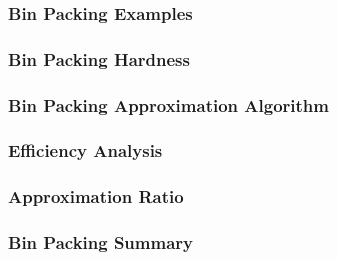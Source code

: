 \documentclass{beamer}
\begin{document}
\begin{frame} \frametitle{Bin Packing Examples}
\end{frame}

\begin{frame} \frametitle{Bin Packing Hardness}
\end{frame}

\begin{frame} \frametitle{Bin Packing Approximation Algorithm}
\end{frame}

\begin{frame} \frametitle{Efficiency Analysis}
\end{frame}

\begin{frame} \frametitle{Approximation Ratio}
\end{frame}

\begin{frame} \frametitle{Bin Packing Summary}
\end{frame}
\end{document}
